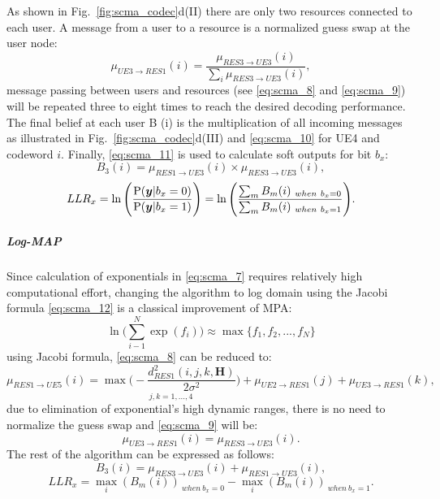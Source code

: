 As shown in Fig.~\ref{fig:scma_codec}d(II) there are only two resources
connected to each user. A message from a user to a resource is a normalized
guess swap at the user node:
\begin{equation}
  \label{eq:scma_9}
  \mu_{UE3 \rightarrow RES1}(i) = \frac{\mu_{RES3 \rightarrow UE3}(i)}
  {\sum_i\mu_{RES3 \rightarrow UE3}(i)},
\end{equation}
message passing between users and resources (see \eqref{eq:scma_8} and
\eqref{eq:scma_9}) will be repeated three to eight times to reach the desired
decoding performance. The final belief at each user B (i) is the multiplication
of all incoming messages as illustrated in Fig.~{\ref{fig:scma_codec}}d(III) and
\eqref{eq:scma_10} for UE4 and codeword $i$. Finally, \eqref{eq:scma_11} is used
to calculate soft outputs for bit $b_x$:
\begin{equation}
  \label{eq:scma_10}
  B_3(i) = \mu_{RES1 \rightarrow UE3}(i) \times \mu_{RES3 \rightarrow UE3}(i),
\end{equation}
\begin{equation}
  \label{eq:scma_11}
  LLR_x = \ln \Bigg( \frac{\operatorname{P}(\bm{y}|b_x=0)}{\operatorname{P}(\bm{y}|b_x=1)} \Bigg) =
  \ln \Bigg( \frac{\sum_m B_m(i)_{~when~b_x=0}}{\sum_m B_m(i)_{~when~b_x=1}}
  \Bigg).
\end{equation}

\subparagraph{Log-MAP}
\label{sec:scma_log-map}

Since calculation of exponentials in \eqref{eq:scma_7} requires relatively high
computational effort, changing the algorithm to log domain using the Jacobi
formula \eqref{eq:scma_12} is a classical improvement of MPA:
\begin{equation}
  \label{eq:scma_12}
  \ln \Bigg( \sum\limits_{i-1}^N\exp(f_i) \Bigg) \approx \max\{f_1,f_2,...,f_N\}
\end{equation}
using Jacobi formula, \eqref{eq:scma_8} can be reduced to:
\begin{equation}
  \label{eq:scma_13}
  \mu_{RES1 \rightarrow UE5}(i) = \underset{j,k=1,...,4}
  {\max \Bigg(-\frac{d_{RES1}^2(i,j,k,\bm{H})}{2\sigma^2} \Bigg)} +
  \mu_{UE2 \rightarrow RES1}(j) + \mu_{UE3 \rightarrow RES1}(k),
\end{equation}
due to elimination of exponential's high dynamic ranges, there is no need to
normalize the guess swap and \eqref{eq:scma_9} will be:
\begin{equation}
  \label{eq:scma_14}
  \mu_{UE3 \rightarrow RES1}(i) = \mu_{RES3 \rightarrow UE3}(i).
\end{equation}
The rest of the algorithm can be expressed as follows:
\begin{equation}
  \label{eq:scma_15}
  B_3(i) = \mu_{RES3 \rightarrow UE3}(i) + \mu_{RES1 \rightarrow UE3}(i),
\end{equation}
\begin{equation}
  \label{eq:scma_16}
  LLR_x = \max_i(B_m(i))_{~when~b_x=0} - \max_i(B_m(i))_{~when~b_x=1}.
\end{equation}

